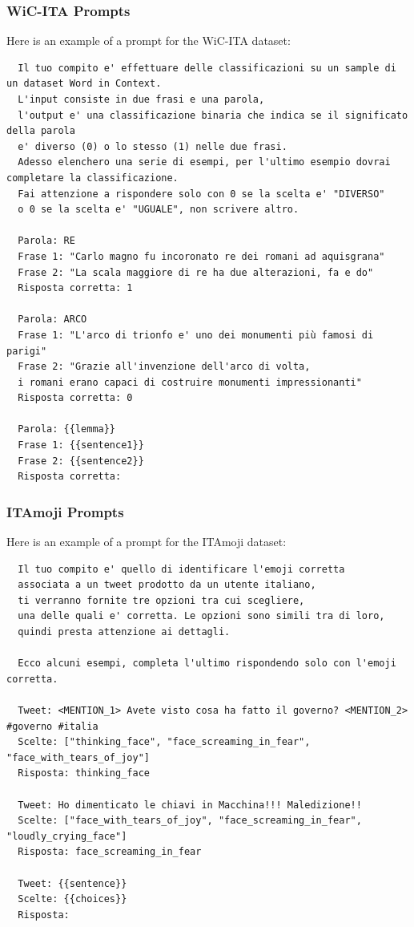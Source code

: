 \documentclass[english, xcolor={table,usenames}]{beamer}
\begin{document}
\begin{frame}[fragile]
  \frametitle{WiC-ITA Prompts}

  Here is an example of a prompt for the WiC-ITA dataset:

  \tiny\begin{verbatim}
  Il tuo compito e' effettuare delle classificazioni su un sample di un dataset Word in Context.
  L'input consiste in due frasi e una parola, 
  l'output e' una classificazione binaria che indica se il significato della parola 
  e' diverso (0) o lo stesso (1) nelle due frasi.
  Adesso elenchero una serie di esempi, per l'ultimo esempio dovrai completare la classificazione.
  Fai attenzione a rispondere solo con 0 se la scelta e' "DIVERSO" 
  o 0 se la scelta e' "UGUALE", non scrivere altro. 
  
  Parola: RE
  Frase 1: "Carlo magno fu incoronato re dei romani ad aquisgrana"
  Frase 2: "La scala maggiore di re ha due alterazioni, fa e do"
  Risposta corretta: 1
  
  Parola: ARCO
  Frase 1: "L'arco di trionfo e' uno dei monumenti più famosi di parigi"
  Frase 2: "Grazie all'invenzione dell'arco di volta, 
  i romani erano capaci di costruire monumenti impressionanti"
  Risposta corretta: 0

  Parola: {{lemma}}
  Frase 1: {{sentence1}}
  Frase 2: {{sentence2}}
  Risposta corretta:
\end{verbatim}
\end{frame}


\begin{frame}[fragile]
  \frametitle{ITAmoji Prompts}

  Here is an example of a prompt for the ITAmoji dataset:

  \tiny\begin{verbatim}
  Il tuo compito e' quello di identificare l'emoji corretta 
  associata a un tweet prodotto da un utente italiano, 
  ti verranno fornite tre opzioni tra cui scegliere, 
  una delle quali e' corretta. Le opzioni sono simili tra di loro, 
  quindi presta attenzione ai dettagli.

  Ecco alcuni esempi, completa l'ultimo rispondendo solo con l'emoji corretta.

  Tweet: <MENTION_1> Avete visto cosa ha fatto il governo? <MENTION_2> #governo #italia
  Scelte: ["thinking_face", "face_screaming_in_fear", "face_with_tears_of_joy"]
  Risposta: thinking_face

  Tweet: Ho dimenticato le chiavi in Macchina!!! Maledizione!!
  Scelte: ["face_with_tears_of_joy", "face_screaming_in_fear", "loudly_crying_face"]
  Risposta: face_screaming_in_fear

  Tweet: {{sentence}}
  Scelte: {{choices}}
  Risposta:
\end{verbatim}

\end{frame}
\end{document}
